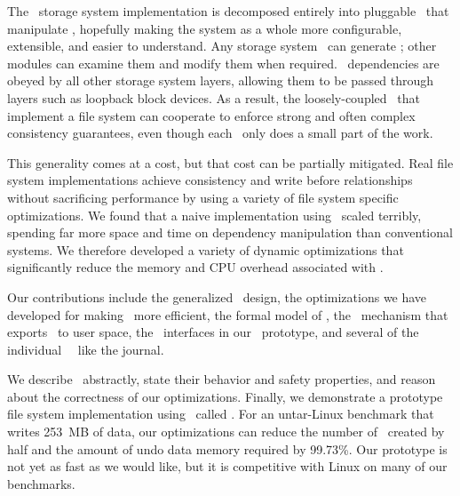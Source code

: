 The \Kudos\ storage system implementation is decomposed entirely into
 pluggable \modules\ that manipulate \patches, hopefully making the system
 as a whole more configurable, extensible, and easier to understand.
%
Any storage system \module\ can generate \patches; other modules can examine
 them and modify them when required.
%
\Patch\ dependencies are obeyed by all other storage system layers, allowing
 them to be passed through layers such as loopback block devices.
%
As a result, the loosely-coupled \modules\ that implement a file system
 can cooperate to enforce strong and often complex consistency guarantees,
 even though each \module\ only does a small part of the work.


This generality comes at a cost, but that cost can be partially mitigated.
%
Real file system implementations achieve consistency and write before
 relationships without sacrificing performance by using a variety of file
 system specific optimizations.
%
We found that a naive implementation using \patches\ scaled terribly,
 spending far more space and time on dependency manipulation than
 conventional systems.
%
We therefore developed a variety of dynamic optimizations that
 significantly reduce the memory and CPU overhead associated with \patches.


Our contributions include the generalized \patch\ design, the
 optimizations we have developed for making \patches\ more efficient,
 the formal model of \patches, the \patchgroup\ mechanism that exports
 \patches\ to user space, the \module\ interfaces in our \Kudos\
 prototype, and several of the individual \Kudos\ \modules\ like the
 journal.


We describe \patches\ abstractly, state their behavior and safety
 properties, and reason about the correctness of our optimizations.
%
Finally, we demonstrate a prototype file system implementation using
 \patches\ called \Kudos.
%
For an untar-Linux benchmark that writes 253~MB of data, our optimizations
 can reduce the number of \patches\ created by half and the amount of
 undo data memory required by 99.73\%. 
%
Our prototype is not yet as fast as we would like, but it is competitive
 with Linux on many of our benchmarks.

